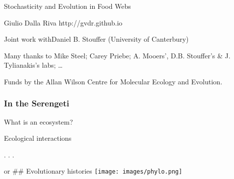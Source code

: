 \begin{frame}\frametitle{}

\begin{block}{Stochasticity and Evolution in Food Webs}

\begin{block}{Giulio Dalla Riva http://gvdr.github.io}

Joint work withDaniel B. Stouffer (University of Canterbury)

Many thanks to Mike Steel; Carey Priebe; A. Mooers', D.B. Stouffer's \&
J. Tylianakis's labs; \ldots{}

Funds by the Allan Wilson Centre for Molecular Ecology and Evolution.

\end{block}

\end{block}

\end{frame}

\begin{frame}\frametitle{In the Serengeti }

What is an ecosystem?

\begin{block}{Ecological interactions}

. . .

or \#\# Evolutionary histories \texttt{[image: images/phylo.png]}

\end{block}

\end{frame}
